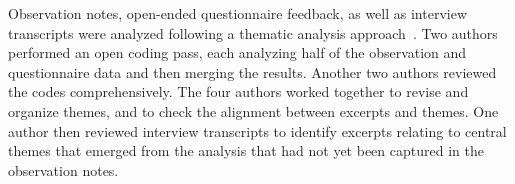Observation notes, open-ended questionnaire feedback, as well as interview transcripts were analyzed following a thematic analysis approach~\cite{ref:blandford2016qualitative}. Two authors performed an open coding pass, each analyzing half of the observation and questionnaire data and then merging the results. Another two authors reviewed the codes comprehensively. The four authors worked together to revise and organize themes, and to check the alignment between excerpts and themes. One author then reviewed interview transcripts to identify excerpts relating to central themes that emerged from the analysis that had not yet been captured in the observation notes.


